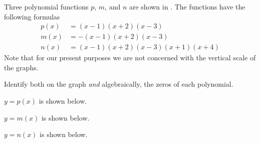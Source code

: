 \begin{exercises}
\begin{problem}
\begin{multicols}{3}
\begin{subproblem}
\begin{shortsolution}
		\end{shortsolution}
	\end{subproblem}
\end{multicols}
\end{problem}
\begin{problem}
Three polynomial functions $p$, $m$, and $n$ are shown in .
The functions have the following formulas
\begin{align*}
	p(x) & = (x-1)(x+2)(x-3)           \\ 
	m(x) & = -(x-1)(x+2)(x-3)          \\
	n(x) & = (x-1)(x+2)(x-3)(x+1)(x+4) 
\end{align*}
Note that for our present purposes we are not concerned with the vertical scale of the graphs.
\begin{subproblem}
	Identify both on the graph {\em and} algebraically, the zeros of each polynomial.
	\begin{shortsolution}
		$y=p(x)$ is shown below.
		
		
		$y=m(x)$ is shown below.
		
		
		$y=n(x)$ is shown below.
		
		

\end{shortsolution}
\end{subproblem}
\end{problem}
\end{exercises}
